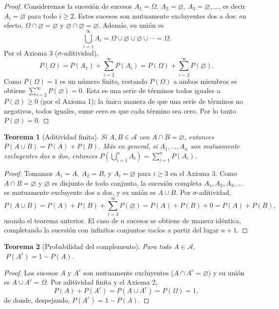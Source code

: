 \documentclass[11pt,a4paper]{article}
\theoremstyle{plain}
\newtheorem{teorema}{Teorema}[section]
\theoremstyle{definition}
\theoremstyle{remark}
\begin{document}
\begin{proof}
Consideremos la sucesión de sucesos $A_1=\Omega,\ A_2=\varnothing,\ A_3=\varnothing,\dots$, es decir $A_i=\varnothing$ para todo $i\geq 2$. Estos sucesos son mutuamente excluyentes dos a dos: en efecto, $\Omega \cap \varnothing = \varnothing$ y $\varnothing\cap\varnothing=\varnothing$. Además, su unión es
\[
\bigcup_{i=1}^{\infty} A_i = \Omega \cup \varnothing \cup \varnothing \cup \cdots = \Omega.
\]
Por el Axioma 3 ($\sigma$-aditividad),
\[
P(\Omega) = P(A_1) + \sum_{i=2}^{\infty} P(A_i) = P(\Omega) + \sum_{i=2}^{\infty} P(\varnothing).
\]
Como $P(\Omega)=1$ es un número finito, restando $P(\Omega)$ a ambos miembros se obtiene $\sum_{i=2}^\infty P(\varnothing) = 0$. Esta es una serie de términos todos iguales a $P(\varnothing) \geq 0$ (por el Axioma 1); la única manera de que una serie de términos no negativos, todos iguales, sume cero es que cada término sea cero. Por lo tanto $P(\varnothing)=0$.
\end{proof}

\begin{teorema}[Aditividad finita]
Si $A, B \in \mathcal{A}$ con $A \cap B = \varnothing$, entonces $P(A\cup B) = P(A)+P(B)$. Más en general, si $A_1,\dots,A_n$ son mutuamente excluyentes dos a dos, entonces $P\left(\bigcup_{i=1}^n A_i\right) = \sum_{i=1}^n P(A_i)$.
\end{teorema}

\begin{proof}
Tomamos $A_1=A,\ A_2=B$, y $A_i=\varnothing$ para $i\geq 3$ en el Axioma 3. Como $A\cap B=\varnothing$ y $\varnothing$ es disjunto de todo conjunto, la sucesión completa $A_1,A_2,A_3,\dots$ es mutuamente excluyente dos a dos, y su unión es $A\cup B$. Por $\sigma$-aditividad,
\[
P(A\cup B) = P(A)+P(B)+\sum_{i=3}^\infty P(\varnothing) = P(A)+P(B)+0 = P(A)+P(B),
\]
usando el teorema anterior. El caso de $n$ sucesos se obtiene de manera idéntica, completando la sucesión con infinitos conjuntos vacíos a partir del lugar $n+1$.
\end{proof}

\begin{teorema}[Probabilidad del complemento]
Para todo $A \in \mathcal{A}$, $\; P(A^c) = 1 - P(A)$.
\end{teorema}

\begin{proof}
Los sucesos $A$ y $A^c$ son mutuamente excluyentes ($A \cap A^c = \varnothing$) y su unión es $A \cup A^c = \Omega$. Por aditividad finita y el Axioma 2,
\[
P(A) + P(A^c) = P(A\cup A^c) = P(\Omega) = 1,
\]
de donde, despejando, $P(A^c) = 1-P(A)$.
\end{proof}
\end{document}
